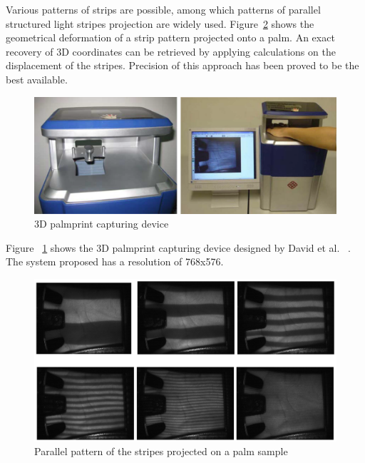 Various patterns of strips are possible, among which patterns of parallel structured light stripes projection are widely used. Figure~\ref{fig:pastwork:strippattern} shows the geometrical deformation of a strip pattern projected onto a palm. An exact recovery of 3D coordinates can be retrieved by applying calculations on the displacement of the stripes. Precision of this approach has been proved to be the best available.

\begin{figure}[htb]
\begin{center}
\includegraphics[width=0.9\linewidth]{ch-pastwork/figures/device}
\caption{3D palmprint capturing device}
\label{fig:pastwork:device}
\end{center}
\end{figure}

Figure ~\ref{fig:pastwork:device} shows the 3D palmprint capturing device designed by David et al. ~\cite{Zhang:2008kc}. The system proposed has a resolution of 768x576.

\begin{figure}[htb]
\begin{center}
\includegraphics[width=0.9\linewidth]{ch-pastwork/figures/strippattern}
\caption[Parallel pattern of the stripes projected on a palm sample]{Parallel pattern of the stripes projected on a palm sample~\cite{Li:2009eq}}
\label{fig:pastwork:strippattern}
\end{center}
\end{figure}

